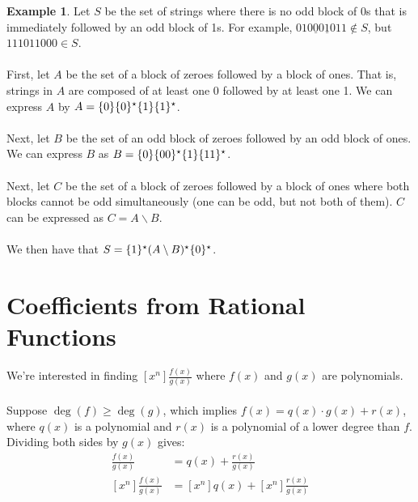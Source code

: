 \documentclass[]{article}
\theoremstyle{definition}
\newtheorem{ex}{Example}[section]
\newcommand{\lecture}[1]{\marginpar{{\footnotesize $\leftarrow$ \underline{#1}}}}
\DeclarePairedDelimiter{\set}{\lbrace}{\rbrace}
\begin{document}
				\begin{ex}
					Let $S$ be the set of strings where there is no odd block of 0s that is immediately followed by an odd block of 1s. For example, $01\underline{000}\underline{1}011 \not \in S$, but $111011000 \in S$.
					\\ \\
					First, let $A$ be the set of a block of zeroes followed by a block of ones. That is, strings in $A$ are composed of at least one 0 followed by at least one 1. We can express $A$ by $A = \set{0}\set{0}^\star\set{1}\set{1}^\star$.
					\\ \\
					Next, let $B$ be the set of an odd block of zeroes followed by an odd block of ones. We can express $B$ as $B = \set{0}\set{00}^\star\set{1}\set{11}^\star$.
					\\ \\
					Next, let $C$ be the set of a block of zeroes followed by a block of ones where both blocks cannot be odd simultaneously (one can be odd, but not both of them). $C$ can be expressed as $C = A \mathbin{\backslash} B$.
					\\ \\
					We then have that $S = \set{1}^\star(A \mathbin{\backslash} B)^\star \set{0}^\star$.

				\end{ex}

	\section{Coefficients from Rational Functions} \lecture{February 6, 2013}
		We're interested in finding $[x^n]\frac{f(x)}{g(x)}$ where $f(x)$ and $g(x)$ are polynomials.
		\\ \\
		Suppose $\deg(f) \ge \deg(g)$, which implies $f(x) = q(x) \cdot g(x) + r(x)$, where $q(x)$ is a polynomial and $r(x)$ is a polynomial of a lower degree than $f$. Dividing both sides by $g(x)$ gives:
		\begin{align*}
			\frac{f(x)}{g(x)} &= q(x) + \frac{r(x)}{g(x)} \\
			[x^n] \frac{f(x)}{g(x)} &= [x^n] q(x) + [x^n] \frac{r(x)}{g(x)}
		\end{align*}
\end{document}
